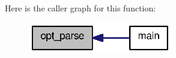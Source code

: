 Here is the caller graph for this function:\nopagebreak
\begin{figure}[H]
\begin{center}
\leavevmode
\includegraphics[width=178pt]{buddy__main_8c_adbe704e27f14c47d6f5fbe8689e140d0_icgraph}
\end{center}
\end{figure}


